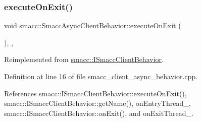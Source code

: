 \subsubsection{\texorpdfstring{execute\+On\+Exit()}{executeOnExit()}}
{\footnotesize\ttfamily void smacc\+::\+Smacc\+Async\+Client\+Behavior\+::execute\+On\+Exit (\begin{DoxyParamCaption}{ }\end{DoxyParamCaption})\hspace{0.3cm}{\ttfamily [override]}, {\ttfamily [protected]}, {\ttfamily [virtual]}}



Reimplemented from \hyperlink{classsmacc_1_1ISmaccClientBehavior_ac88fbad78c928b4bca6d18659ddfd8c0}{smacc\+::\+I\+Smacc\+Client\+Behavior}.



Definition at line 16 of file smacc\+\_\+client\+\_\+async\+\_\+behavior.\+cpp.



References smacc\+::\+I\+Smacc\+Client\+Behavior\+::execute\+On\+Exit(), smacc\+::\+I\+Smacc\+Client\+Behavior\+::get\+Name(), on\+Entry\+Thread\+\_\+, smacc\+::\+I\+Smacc\+Client\+Behavior\+::on\+Exit(), and on\+Exit\+Thread\+\_\+.


